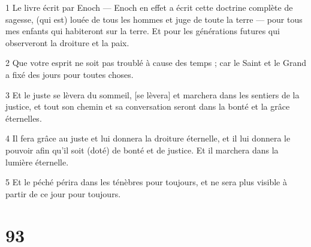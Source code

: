 \par 1 Le livre écrit par Enoch — Enoch en effet a écrit cette doctrine complète de sagesse, (qui est) louée de tous les hommes et juge de toute la terre — pour tous mes enfants qui habiteront sur la terre. Et pour les générations futures qui observeront la droiture et la paix.
\par 2 Que votre esprit ne soit pas troublé à cause des temps ; car le Saint et le Grand a fixé des jours pour toutes choses.
\par 3 Et le juste se lèvera du sommeil, [se lèvera] et marchera dans les sentiers de la justice, et tout son chemin et sa conversation seront dans la bonté et la grâce éternelles.
\par 4 Il fera grâce au juste et lui donnera la droiture éternelle, et il lui donnera le pouvoir afin qu'il soit (doté) de bonté et de justice. Et il marchera dans la lumière éternelle.
\par 5 Et le péché périra dans les ténèbres pour toujours, et ne sera plus visible à partir de ce jour pour toujours.

\chapter{93}

